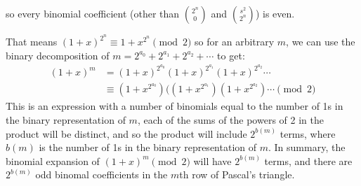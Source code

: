 \documentclass{article}
\begin{document}
\begin{enumerate}
    so every binomial coefficient (other than $\binom{2^n}{0}$ and $\binom{s^2}{2^n}$) is even.
    
    That means $(1+x)^{2^n} \equiv 1+x^{2^n} \pmod{2}$ so for an arbitrary $m$, we can use the binary decomposition of $m = 2^{a_0} + 2^{a_1} + 2^{a_2} + \cdots$ to get:
    \begin{align*}
        (1+x)^m &= (1+x)^{2^{a_0}}(1+x)^{2^{a_1}}(1+x)^{2^{a_2}}\cdots \\
        & \equiv (1+x^{2^{a_0}})((1+x^{2^{a_1}})(1+x^{2^{a_2}})\cdots \pmod{2}
    \end{align*}
    This is an expression with a number of binomials equal to the number of 1s in the binary representation of $m$, each of the sums of the powers of 2 in the product will be distinct, and so the product will include $2^{b(m)}$ terms, where $b(m)$ is the number of 1s in the binary representation of $m$. In summary, the binomial expansion of $(1+x)^m \pmod{2}$ will have $2^{b(m)}$ terms, and there are $2^{b(m)}$ odd binomal coefficients in the $m$th row of Pascal's triangle.
    
\end{enumerate}
\end{document}
